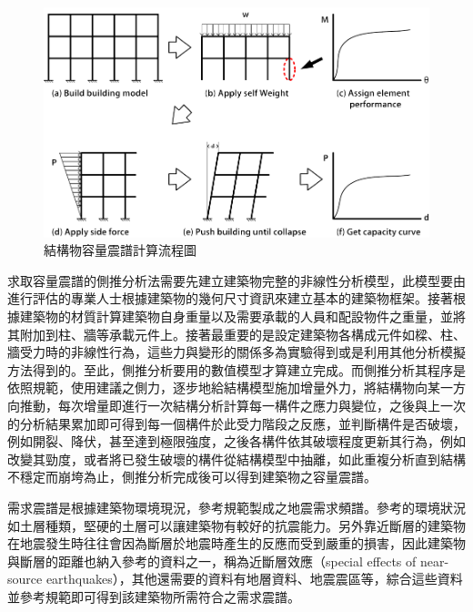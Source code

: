\begin{figure}[hbtp]
  \begin{center}
    \includegraphics[width=1.0\textwidth]{figures/capacity-curve.png}
    \caption{結構物容量震譜計算流程圖}
    \label{fig:capacity-curve}
  \end{center}
\end{figure}

求取容量震譜的側推分析法需要先建立建築物完整的非線性分析模型，此模型要由進行評估的專業人士根據建築物的幾何尺寸資訊來建立基本的建築物框架。接著根據建築物的材質計算建築物自身重量以及需要承載的人員和配設物件之重量，並將其附加到柱、牆等承載元件上。接著最重要的是設定建築物各構成元件如樑、柱、牆受力時的非線性行為，這些力與變形的關係多為實驗得到或是利用其他分析模擬方法得到的。至此，側推分析要用的數值模型才算建立完成。而側推分析其程序是依照規範，使用建議之側力，逐步地給結構模型施加增量外力，將結構物向某一方向推動，每次增量即進行一次結構分析計算每一構件之應力與變位，之後與上一次的分析結果累加即可得到每一個構件於此受力階段之反應，並判斷構件是否破壞，例如開裂、降伏，甚至達到極限強度，之後各構件依其破壞程度更新其行為，例如改變其勁度，或者將已發生破壞的構件從結構模型中抽離，如此重複分析直到結構不穩定而崩垮為止，側推分析完成後可以得到建築物之容量震譜。

需求震譜是根據建築物環境現況，參考規範製成之地震需求頻譜。參考的環境狀況如土層種類，堅硬的土層可以讓建築物有較好的抗震能力。另外靠近斷層的建築物在地震發生時往往會因為斷層於地震時產生的反應而受到嚴重的損害，因此建築物與斷層的距離也納入參考的資料之一，稱為近斷層效應（special effects of near-source earthquakes），其他還需要的資料有地層資料、地震震區等，綜合這些資料並參考規範即可得到該建築物所需符合之需求震譜。

